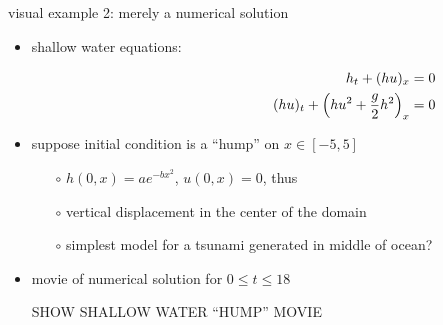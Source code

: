 \documentclass[10pt,hyperref,dvipsnames]{beamer}
\begin{document}
\begin{frame}{visual example 2: merely a numerical solution}

\begin{itemize}
\item shallow water equations:

\vspace{-11.5mm}
\begin{align*}
\hspace{60mm} h_t + (hu)_x &= 0 \\
(hu)_t + \left(h u^2 + \frac{g}{2} h^2\right)_x &= 0
\end{align*}
\item suppose initial condition is a ``hump'' on $x\in[-5,5]$
    \begin{itemize}
    \item[$\circ$] $h(0,x)=a e^{-bx^2}$, $u(0,x)=0$, thus
    \item[$\circ$] vertical displacement in the center of the domain
    \item[$\circ$] simplest model for a tsunami generated in middle of ocean?
    \end{itemize}
\item movie of numerical solution for $0 \le t \le 18$

\vspace{10mm}
\begin{center}
\alert{SHOW SHALLOW WATER ``HUMP'' MOVIE}
\end{center}

\vspace{10mm}

\end{itemize}
\end{frame}
\end{document}

